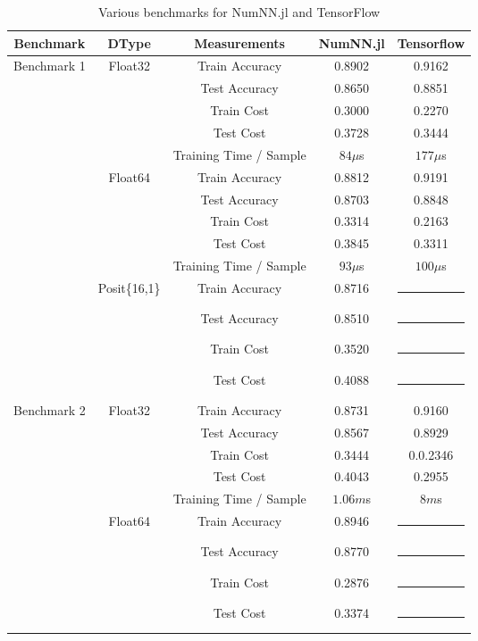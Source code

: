 \begin{table}[!ht]
	\centering
	\renewcommand{\arraystretch}{1.1}
	\caption{Various benchmarks for NumNN.jl and TensorFlow}\label{tab:bench}
	\begin{tabular}{|c | c | c || c | c |}
		\hline
		Benchmark & DType & Measurements & NumNN.jl & Tensorflow\\\hline\hline
		\multirow{14}{*}{Benchmark 1} & \multirow{5}{*}{Float32} & Train Accuracy & 0.8902 & 0.9162\\
		& & Test Accuracy & 0.8650 & 0.8851\\
		& & Train Cost & 0.3000 & 0.2270\\
		& & Test Cost & 0.3728 & 0.3444\\
		& & Training Time / Sample & $84\mu$s  & $177\mu$s\\\cline{2-5}
		& \multirow{5}{*}{Float64} & Train Accuracy & 0.8812 & 0.9191 \\
		& & Test Accuracy & 0.8703 & 0.8848 \\
		& & Train Cost & 0.3314 & 0.2163 \\
		& & Test Cost & 0.3845 & 0.3311 \\
		& & Training Time / Sample & $93\mu$s & $100\mu$s\\\cline{2-5}
		& \multirow{4}{*}{Posit\{16,1\}} & Train Accuracy & 0.8716 & \rule{5em}{1pt} \\
		& & Test Accuracy & 0.8510 & \rule{5em}{1pt} \\
		& & Train Cost & 0.3520 & \rule{5em}{1pt} \\
		& & Test Cost & 0.4088 & \rule{5em}{1pt} \\\hline
		\multirow{14}{*}{Benchmark 2\footref{batchnorm}} & \multirow{5}{*}{Float32} & Train Accuracy & 0.8731 & 0.9160\\
		& & Test Accuracy & 0.8567 & 0.8929\\
		& & Train Cost & 0.3444 & 0.0.2346\\
		& & Test Cost & 0.4043 & 0.2955\\
		& & Training Time / Sample & $1.06m$s & $8m$s \\\cline{2-5}
		& \multirow{5}{*}{Float64} & Train Accuracy & 0.8946 & \rule{5em}{1pt} \\
		& & Test Accuracy & 0.8770 & \rule{5em}{1pt} \\
		& & Train Cost & 0.2876 & \rule{5em}{1pt} \\
		& & Test Cost & 0.3374 & \rule{5em}{1pt} \\

\end{tabular}
\end{table}

